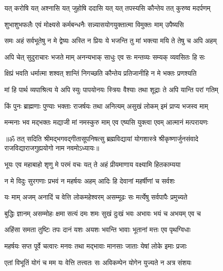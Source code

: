 \twolineshloka
{यत् करोषि यत् अश्नासि यत् जुहोषि ददासि यत्}
{यत् तपस्यसि कौन्तेय तत् कुरुष्व मदर्पणम्}%

\twolineshloka
{शुभाशुभफलैः एवं मोक्ष्यसे कर्मबन्धनैः}
{सन्न्यासयोगयुक्तात्मा विमुक्तः माम् उपैष्यसि}%

\twolineshloka
{समः अहं सर्वभूतेषु न मे द्वेष्यः अस्ति न प्रियः}
{ये भजन्ति तु मां भक्त्या मयि ते तेषु च अपि अहम्}%

\twolineshloka
{अपि चेत् सुदुराचारः भजते माम् अनन्यभाक्}
{साधुः एव सः मन्तव्यः सम्यक् व्यवसितः हि सः}%

\twolineshloka
{क्षिप्रं भवति धर्मात्मा शश्वत् शान्तिं निगच्छति}
{कौन्तेय प्रतिजानीहि न मे भक्तः प्रणश्यति}%

\twolineshloka
{मां हि पार्थ व्यपाश्रित्य ये अपि स्युः पापयोनयः}
{स्त्रियः वैश्याः तथा शूद्राः ते अपि यान्ति परां गतिम्}%

\twolineshloka
{किं पुनः ब्राह्मणाः पुण्याः भक्ताः राजर्षयः तथा}
{अनित्यम् असुखं लोकम् इमं प्राप्य भजस्व माम्}%

\twolineshloka
{मन्मनाः भव मद्भक्तः मद्याजी मां नमस्कुरु}
{माम् एव एष्यसि युक्त्वा एवम् आत्मानं मत्परायणः}%

{॥ॐ तत् सदिति श्रीमद्भगवद्गीतासूपनिषत्सु ब्रह्मविद्यायां योगशास्त्रे श्रीकृष्णार्जुनसंवादे राजविद्याराजगुह्ययोगो नाम नवमोऽध्यायः॥}



\twolineshloka
{भूयः एव महाबाहो शृणु मे परमं वचः}
{यत् ते अहं प्रीयमाणाय वक्ष्यामि हितकाम्यया}%

\twolineshloka
{न मे विदुः सुरगणाः प्रभवं न महर्षयः}
{अहम् आदिः हि देवानां महर्षीणां च सर्वशः}%

\twolineshloka
{यः माम् अजम् अनादिं च वेत्ति लोकमहेश्वरम्}
{असम्मूढः सः मर्त्येषु सर्वपापैः प्रमुच्यते}%

\twolineshloka
{बुद्धिः ज्ञानम् असम्मोहः क्षमा सत्यं दमः शमः}
{सुखं दुःखं भवः अभावः भयं च अभयम् एव च}%

\twolineshloka
{अहिंसा समता तुष्टिः तपः दानं यशः अयशः}
{भवन्ति भावाः भूतानां मत्तः एव पृथग्विधाः}%

\twolineshloka
{महर्षयः सप्त पूर्वे चत्वारः मनवः तथा}
{मद्भावाः मानसाः जाताः येषां लोके इमाः प्रजाः}%

\twolineshloka
{एतां विभूतिं योगं च मम यः वेत्ति तत्त्वतः}
{सः अविकम्पेन योगेन युज्यते न अत्र संशयः}%

